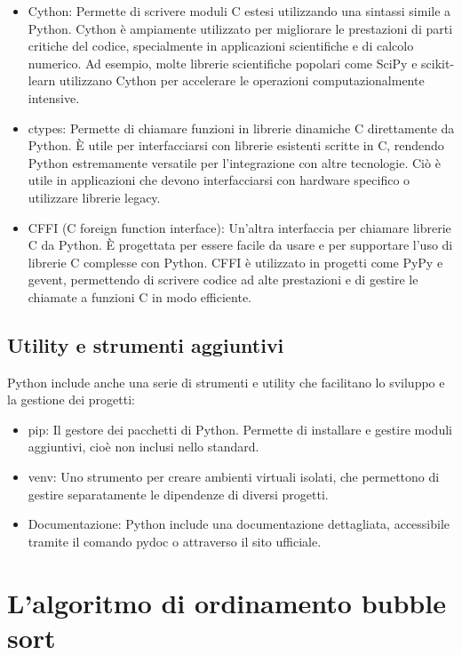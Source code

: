\documentclass[
  letterpaper,
]{scrbook}
\providecommand{\tightlist}{%
  \setlength{\itemsep}{0pt}\setlength{\parskip}{0pt}}\usepackage{longtable,booktabs,array}
\begin{document}
\begin{itemize}
\tightlist
\item
  Cython: Permette di scrivere moduli C estesi utilizzando una sintassi
  simile a Python. Cython è ampiamente utilizzato per migliorare le
  prestazioni di parti critiche del codice, specialmente in applicazioni
  scientifiche e di calcolo numerico. Ad esempio, molte librerie
  scientifiche popolari come SciPy e scikit-learn utilizzano Cython per
  accelerare le operazioni computazionalmente intensive.
\item
  ctypes: Permette di chiamare funzioni in librerie dinamiche C
  direttamente da Python. È utile per interfacciarsi con librerie
  esistenti scritte in C, rendendo Python estremamente versatile per
  l'integrazione con altre tecnologie. Ciò è utile in applicazioni che
  devono interfacciarsi con hardware specifico o utilizzare librerie
  legacy.
\item
  CFFI (C foreign function interface): Un'altra interfaccia per chiamare
  librerie C da Python. È progettata per essere facile da usare e per
  supportare l'uso di librerie C complesse con Python. CFFI è utilizzato
  in progetti come PyPy e gevent, permettendo di scrivere codice ad alte
  prestazioni e di gestire le chiamate a funzioni C in modo efficiente.
\end{itemize}

\subsection{Utility e strumenti
aggiuntivi}\label{utility-e-strumenti-aggiuntivi}

Python include anche una serie di strumenti e utility che facilitano lo
sviluppo e la gestione dei progetti:

\begin{itemize}
\tightlist
\item
  pip: Il gestore dei pacchetti di Python. Permette di installare e
  gestire moduli aggiuntivi, cioè non inclusi nello standard.
\item
  venv: Uno strumento per creare ambienti virtuali isolati, che
  permettono di gestire separatamente le dipendenze di diversi progetti.
\item
  Documentazione: Python include una documentazione dettagliata,
  accessibile tramite il comando pydoc o attraverso il sito ufficiale.
\end{itemize}

\section{L'algoritmo di ordinamento bubble
sort}\label{lalgoritmo-di-ordinamento-bubble-sort}
\end{document}
